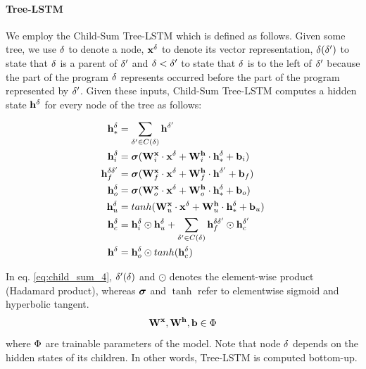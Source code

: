 \paragraph{Tree-LSTM} We employ the Child-Sum Tree-LSTM \cite{taiImprovedSemanticRepresentations2015} which is defined as follows. Given some tree, we use $\delta$ to denote a node, $\mathbf{x}^\delta$ to denote its vector representation, $\delta(\delta')$ to state that $\delta$ is a parent of $\delta'$ and $\delta < \delta'$ to state that $\delta$ is to the left of $\delta'$ because the part of the program $\delta$ represents occurred before the part of the program represented by $\delta'$.
Given these inputs, Child-Sum Tree-LSTM computes a hidden state $\mathbf{h}^\delta$ for every node of the tree as follows:

\begin{align}\label{eq:tree_lstm_encoder}
    \mathbf{h}^\delta_{*} &= \sum_{\delta' \in C(\delta)} \mathbf{h}^{\delta'} \\
    \mathbf{h}_i^\delta &= \boldsymbol\sigma(\mathbf{W}^{\mathbf{x}}_{i} \cdot \mathbf{x}^\delta + \mathbf{W}^{\mathbf{h}}_{i} \cdot \mathbf{h}^\delta_* + \mathbf{b}_{i})  \\ 
    \mathbf{h}_f^{\delta \delta'} &= \boldsymbol\sigma(\mathbf{W}^{\mathbf{x}}_{f} \cdot \mathbf{x}^\delta + \mathbf{W}^{\mathbf{h}}_{f} \cdot \mathbf{h}^{\delta'} + \mathbf{b}_{f}) \\\label{eq:child_sum_4}
    \mathbf{h}_o^\delta &= \boldsymbol\sigma(\mathbf{W}^{\mathbf{x}}_{o} \cdot \mathbf{x}^\delta + \mathbf{W}^{\mathbf{h}}_{o} \cdot \mathbf{h}^\delta_* + \mathbf{b}_{o}) \\
    \mathbf{h}_u^\delta &= tanh(\mathbf{W}^{\mathbf{x}}_{u} \cdot \mathbf{x}^\delta + \mathbf{W}^{\mathbf{h}}_{u} \cdot \mathbf{h}^\delta_* + \mathbf{b}_{u}) \\
    \mathbf{h}_c^\delta &= \mathbf{h}_i^\delta \odot \mathbf{h}_u^\delta + \sum_{\delta' \in C(\delta)} \mathbf{h}_f^{\delta \delta'} \odot \mathbf{h}_c^{\delta'} \\
    \mathbf{h}^\delta &= \mathbf{h}_o^\delta \odot tanh(\mathbf{h}_c^\delta)
\end{align}

In eq. \ref{eq:child_sum_4}, $\delta'(\delta)$ and $\odot$ denotes the element-wise product (Hadamard product), whereas $\boldsymbol\sigma$ and $\tanh$ refer to elementwise sigmoid and hyperbolic tangent. 
\begin{equation}
    \mathbf{W}^{\mathbf{x}}, \mathbf{W}^{\mathbf{h}}, \mathbf{b} \in \Phi
\end{equation}
where $\Phi$ are trainable parameters of the model. 
Note that node $\delta$ depends on the hidden states of its children. 
In other words, Tree-LSTM is computed bottom-up. 

